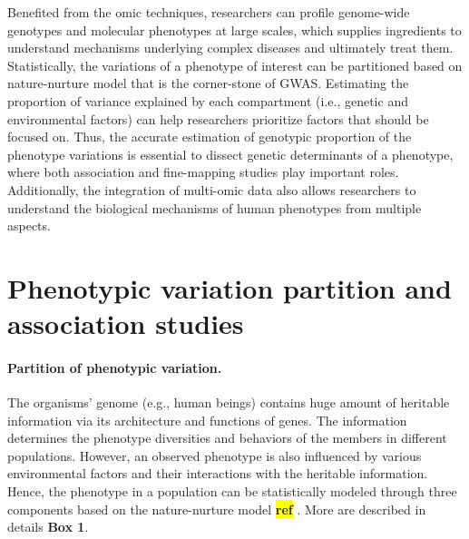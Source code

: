 \documentclass[12pt,usletter,fancy]{elegantbook}
\newcommand{\reqref}[1][ref]{
  \colorbox{yellow}{\textbf{#1}}
}
\begin{document}
Benefited from the omic techniques, researchers can profile genome-wide genotypes and molecular phenotypes at large scales, which supplies ingredients to understand mechanisms underlying complex diseases and ultimately treat them.
Statistically, the variations of a phenotype of interest can be partitioned based on nature-nurture model that is the corner-stone of GWAS.
Estimating the proportion of variance explained by each compartment (i.e., genetic and environmental factors) can help researchers prioritize factors that should be focused on.
Thus, the accurate estimation of genotypic proportion of the phenotype variations is essential to dissect genetic determinants of a phenotype, where both association and fine-mapping studies play important roles.
Additionally, the integration of multi-omic data also allows researchers to understand the biological mechanisms of human phenotypes from multiple aspects.


\section*{Phenotypic variation partition and association studies}
\paragraph*{Partition of phenotypic variation.}
The organisms' genome (e.g., human beings) contains huge amount of heritable information via its architecture and functions of genes.
The information determines the phenotype diversities and behaviors of the members in different populations.
However, an observed phenotype is also influenced by various environmental factors and their interactions with the heritable information.
Hence, the phenotype in a population can be statistically modeled through three components based on the nature-nurture model\reqref.
More are described in details \textbf{Box 1}. %
\end{document}
